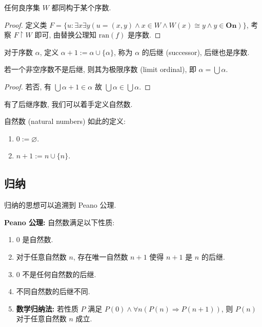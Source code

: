 \begin{lemma}
    任何良序集 \(W\) 都同构于某个序数.

    \begin{proof}
        定义类 \(F = \{u : \exists x \exists y(u=(x,y) \wedge x \in W \wedge W(x) \cong y \wedge y \in \mathbf{On})\}\), 
        考察 \(F \upharpoonright W\) 即可, 由替换公理知 \(\mathrm{ran} (f)\) 是序数.
    \end{proof}
\end{lemma}

\begin{definition}
    对于序数 \(\alpha\), 定义 \(\alpha + 1 := \alpha \cup \{\alpha\}\), 称为 \(\alpha\) 的后继 (successor), 后继也是序数.
\end{definition}

\begin{corollary}
    \label{corollary:ordinal numbers are successors or limits}
    若一个非空序数不是后继, 则其为极限序数 (limit ordinal), 即 \(\alpha = \bigcup \alpha\).

    \begin{proof}
        若否, 有 \(\bigcup \alpha + 1 \in \alpha\) 故 \(\bigcup \alpha \in \bigcup \alpha\).
    \end{proof}
\end{corollary}

有了后继序数, 我们可以着手定义自然数.

\begin{definition}
    \label{definition:natural numbers}
    自然数 (natural numbers) 如此的定义:
    \begin{enumerate}
        \item \(0 := \varnothing\).
        \item \(n + 1 := n \cup \{n\}\).
    \end{enumerate}
\end{definition}

\subsection{归纳}

归纳的思想可以追溯到 Peano 公理.

\begin{example}
    \textbf{Peano 公理:} 自然数满足以下性质:
    \begin{enumerate}
        \item \(0\) 是自然数.
        \item 对于任意自然数 \(n\), 存在唯一自然数 \(n+1\) 使得 \(n+1\) 是 \(n\) 的后继.
        \item \(0\) 不是任何自然数的后继.
        \item 不同自然数的后继不同.
        \item \textbf{数学归纳法:} 若性质 \(P\) 满足 \(P(0) \wedge \forall n (P(n) \Rightarrow P(n+1))\), 则 \(P(n)\) 对于任意自然数 \(n\) 成立. 
    \end{enumerate}
\end{example}

